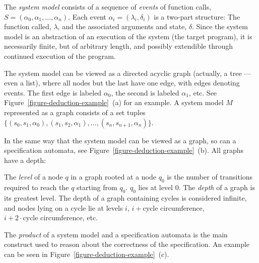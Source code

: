 \begin{mydef}\label{def-system-model}
The \textit{system model} consists of a sequence of \textit{events} of function
calls, $S = (\alpha_0, \alpha_1, \dots, \alpha_n)$. Each event $\alpha_i =
(\lambda_i, \delta_i)$ is a two-part structure: The function called, $\lambda$,
and the associated arguments and state, $\delta$. Since the system model is an
abstraction of an execution of the system (the target program), it is
necessarily finite, but of arbitrary length, and possibly extendible through
continued execution of the program.

The system model can be viewed as a directed acyclic graph (actually, a tree
--- even a list), where all nodes but the last have one edge, with edges
denoting events. The first edge is labeled $\alpha_0$, the second is labeled
$\alpha_1$, etc. See Figure~\ref{figure-deduction-example}~(a) for an example.
A system model $M$ represented as a graph consists of a set tuples
$\{(s_0,s_1,\alpha_0), (s_1,s_2,\alpha_1), \dots, (s_n,s_{n+1},\alpha_n)\}$.
\end{mydef}


In the same way that the system model can be viewed as a graph, so can a
specification automata, see Figure~\ref{figure-deduction-example}~(b). All
graphs have a depth:

\begin{mydef}
The \textit{level} of a node $q$ in a graph rooted at a node $q_0$ is the
number of transitions required to reach the $q$ starting from $q_0$. $q_0$ lies
at level $0$. The \textit{depth} of a graph is its greatest level. The
depth of a graph containing cycles is considered infinite, and nodes lying on a
cycle lie at levels $i$, $i+\text{cycle circumference}$, $i+2\cdot\text{cycle
circumference}$, etc.
\end{mydef}

The \textit{product} of a system model and a specification automata is the main
construct used to reason about the correctness of the specification. An example
can be seen in Figure~\ref{figure-deduction-example}~(c).

